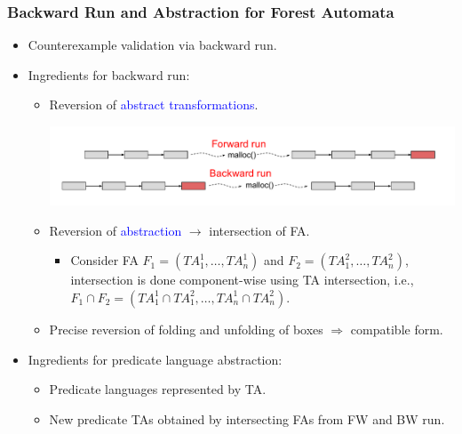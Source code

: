 \documentclass{beamer}
\newcommand{\hlbl}[1]{\textcolor{blue}{#1}}
\newcommand{\hlgr}[1]{\textcolor{olive!50!green}{#1}}
\begin{document}
\begin{frame}
\frametitle{Backward Run and Abstraction for Forest Automata}
		\begin{itemize}
		\item Counterexample validation via backward run.
		\item \hlgr{Ingredients for backward run}:
		\begin{itemize}
			\item Reversion of \hlbl{abstract transformations}.
			\begin{center}
				\includegraphics[scale=0.4]{ex/at.pdf}
			\end{center}
			\pause
			\item Reversion of \hlbl{abstraction} $\rightarrow$ \hlgr{intersection} of FA.
			\begin{itemize}
				\item Consider FA $F_1=(TA_1^1,\ldots,TA_n^1)$ and $F_2=(TA_1^2,\ldots,TA_n^2)$,
					intersection is done \hlgr{component-wise} using TA intersection, i.e.,
					$F_1 \cap F_2 = (TA_1^1 \cap TA_1^2,\ldots,TA_n^1 \cap TA_n^2)$.
			\end{itemize}
		\item Precise reversion of folding and unfolding of boxes $\Rightarrow$ compatible form.
		\end{itemize}
		\pause
		\item \hlgr{Ingredients for predicate language abstraction}:
		\begin{itemize}
			\item Predicate languages represented by TA.
			\item New predicate TAs obtained by intersecting FAs from FW and BW run.
		\end{itemize}
	\end{itemize}

\end{frame}
\end{document}
